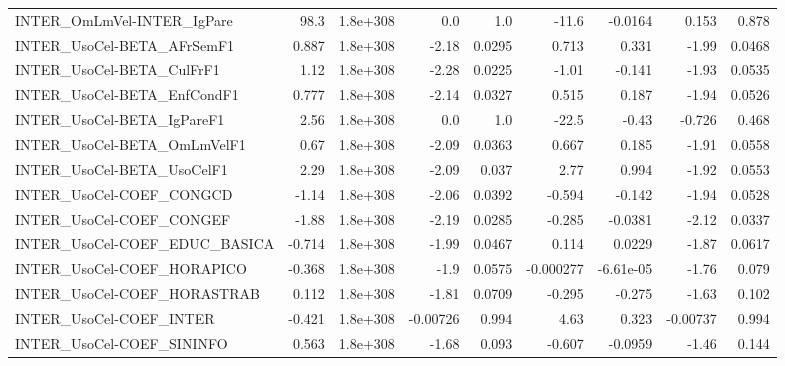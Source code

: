 \begin{tabular}{lrrrrrrrr}
INTER\_OmLmVel-INTER\_IgPare            &        98.3 &     1.8e+308 &      0.0 &      1.0 &      -11.6 &     -0.0164 &        0.153 &         0.878 \\
INTER\_UsoCel-BETA\_AFrSemF1            &       0.887 &     1.8e+308 &    -2.18 &   0.0295 &      0.713 &       0.331 &        -1.99 &        0.0468 \\
INTER\_UsoCel-BETA\_CulFrF1             &        1.12 &     1.8e+308 &    -2.28 &   0.0225 &      -1.01 &      -0.141 &        -1.93 &        0.0535 \\
INTER\_UsoCel-BETA\_EnfCondF1           &       0.777 &     1.8e+308 &    -2.14 &   0.0327 &      0.515 &       0.187 &        -1.94 &        0.0526 \\
INTER\_UsoCel-BETA\_IgPareF1            &        2.56 &     1.8e+308 &      0.0 &      1.0 &      -22.5 &       -0.43 &       -0.726 &         0.468 \\
INTER\_UsoCel-BETA\_OmLmVelF1           &        0.67 &     1.8e+308 &    -2.09 &   0.0363 &      0.667 &       0.185 &        -1.91 &        0.0558 \\
INTER\_UsoCel-BETA\_UsoCelF1            &        2.29 &     1.8e+308 &    -2.09 &    0.037 &       2.77 &       0.994 &        -1.92 &        0.0553 \\
INTER\_UsoCel-COEF\_CONGCD              &       -1.14 &     1.8e+308 &    -2.06 &   0.0392 &     -0.594 &      -0.142 &        -1.94 &        0.0528 \\
INTER\_UsoCel-COEF\_CONGEF              &       -1.88 &     1.8e+308 &    -2.19 &   0.0285 &     -0.285 &     -0.0381 &        -2.12 &        0.0337 \\
INTER\_UsoCel-COEF\_EDUC\_BASICA         &      -0.714 &     1.8e+308 &    -1.99 &   0.0467 &      0.114 &      0.0229 &        -1.87 &        0.0617 \\
INTER\_UsoCel-COEF\_HORAPICO            &      -0.368 &     1.8e+308 &     -1.9 &   0.0575 &  -0.000277 &   -6.61e-05 &        -1.76 &         0.079 \\
INTER\_UsoCel-COEF\_HORASTRAB           &       0.112 &     1.8e+308 &    -1.81 &   0.0709 &     -0.295 &      -0.275 &        -1.63 &         0.102 \\
INTER\_UsoCel-COEF\_INTER               &      -0.421 &     1.8e+308 & -0.00726 &    0.994 &       4.63 &       0.323 &     -0.00737 &         0.994 \\
INTER\_UsoCel-COEF\_SININFO             &       0.563 &     1.8e+308 &    -1.68 &    0.093 &     -0.607 &     -0.0959 &        -1.46 &         0.144 \\

\end{tabular}
